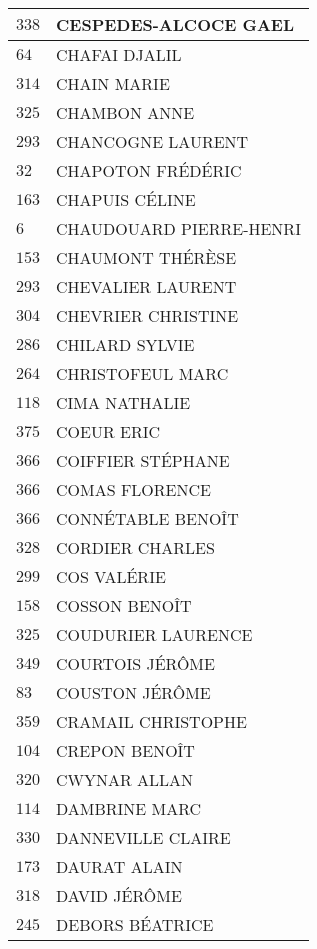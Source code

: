 \begin{xltabular}{\linewidth}{|l|X|}
    \hline
    $338$ & CESPEDES-ALCOCE GAEL \\
    \hline
    $64$ & CHAFAI DJALIL \\
    \hline
    $314$ & CHAIN MARIE \\
    \hline
    $325$ & CHAMBON ANNE \\
    \hline
    $293$ & CHANCOGNE LAURENT \\
    \hline
    $32$ & CHAPOTON FRÉDÉRIC \\
    \hline
    $163$ & CHAPUIS CÉLINE \\
    \hline
    $6$ & CHAUDOUARD PIERRE-HENRI \\
    \hline
    $153$ & CHAUMONT THÉRÈSE \\
    \hline
    $293$ & CHEVALIER LAURENT \\
    \hline
    $304$ & CHEVRIER CHRISTINE \\
    \hline
    $286$ & CHILARD SYLVIE \\
    \hline
    $264$ & CHRISTOFEUL MARC \\
    \hline
    $118$ & CIMA NATHALIE \\
    \hline
    $375$ & COEUR ERIC \\
    \hline
    $366$ & COIFFIER STÉPHANE \\
    \hline
    $366$ & COMAS FLORENCE \\
    \hline
    $366$ & CONNÉTABLE BENOÎT \\
    \hline
    $328$ & CORDIER CHARLES \\
    \hline
    $299$ & COS VALÉRIE \\
    \hline
    $158$ & COSSON BENOÎT \\
    \hline
    $325$ & COUDURIER LAURENCE \\
    \hline
    $349$ & COURTOIS JÉRÔME \\
    \hline
    $83$ & COUSTON JÉRÔME \\
    \hline
    $359$ & CRAMAIL CHRISTOPHE \\
    \hline
    $104$ & CREPON BENOÎT \\
    \hline
    $320$ & CWYNAR ALLAN \\
    \hline
    $114$ & DAMBRINE MARC \\
    \hline
    $330$ & DANNEVILLE CLAIRE \\
    \hline
    $173$ & DAURAT ALAIN \\
    \hline
    $318$ & DAVID JÉRÔME \\
    \hline
    $245$ & DEBORS BÉATRICE \\

\end{xltabular}
